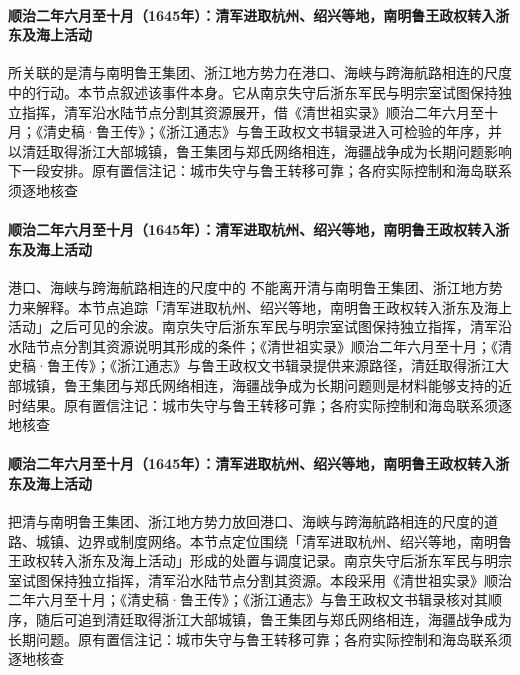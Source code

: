 \paragraph{顺治二年六月至十月（1645年）：清军进取杭州、绍兴等地，南明鲁王政权转入浙东及海上活动}
 所关联的是清与南明鲁王集团、浙江地方势力在港口、海峡与跨海航路相连的尺度中的行动。本节点叙述该事件本身。它从南京失守后浙东军民与明宗室试图保持独立指挥，清军沿水陆节点分割其资源展开，借《清世祖实录》顺治二年六月至十月；《清史稿·鲁王传》；《浙江通志》与鲁王政权文书辑录进入可检验的年序，并以清廷取得浙江大部城镇，鲁王集团与郑氏网络相连，海疆战争成为长期问题影响下一段安排。原有置信注记：城市失守与鲁王转移可靠；各府实际控制和海岛联系须逐地核查

\paragraph{顺治二年六月至十月（1645年）：清军进取杭州、绍兴等地，南明鲁王政权转入浙东及海上活动}
港口、海峡与跨海航路相连的尺度中的 不能离开清与南明鲁王集团、浙江地方势力来解释。本节点追踪「清军进取杭州、绍兴等地，南明鲁王政权转入浙东及海上活动」之后可见的余波。南京失守后浙东军民与明宗室试图保持独立指挥，清军沿水陆节点分割其资源说明其形成的条件；《清世祖实录》顺治二年六月至十月；《清史稿·鲁王传》；《浙江通志》与鲁王政权文书辑录提供来源路径，清廷取得浙江大部城镇，鲁王集团与郑氏网络相连，海疆战争成为长期问题则是材料能够支持的近时结果。原有置信注记：城市失守与鲁王转移可靠；各府实际控制和海岛联系须逐地核查

\paragraph{顺治二年六月至十月（1645年）：清军进取杭州、绍兴等地，南明鲁王政权转入浙东及海上活动}
 把清与南明鲁王集团、浙江地方势力放回港口、海峡与跨海航路相连的尺度的道路、城镇、边界或制度网络。本节点定位围绕「清军进取杭州、绍兴等地，南明鲁王政权转入浙东及海上活动」形成的处置与调度记录。南京失守后浙东军民与明宗室试图保持独立指挥，清军沿水陆节点分割其资源。本段采用《清世祖实录》顺治二年六月至十月；《清史稿·鲁王传》；《浙江通志》与鲁王政权文书辑录核对其顺序，随后可追到清廷取得浙江大部城镇，鲁王集团与郑氏网络相连，海疆战争成为长期问题。原有置信注记：城市失守与鲁王转移可靠；各府实际控制和海岛联系须逐地核查

